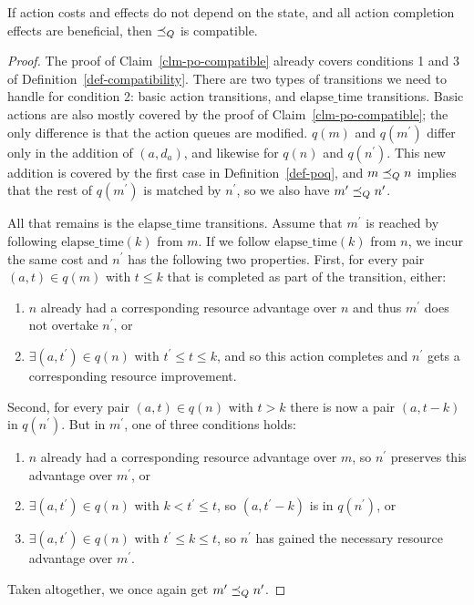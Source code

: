 \documentclass[letterpaper]{article}
\theoremstyle{plain} \newtheorem{theorem}{Theorem} \newtheorem{proposition}{Proposition} \newtheorem{lemma}{Lemma}
\theoremstyle{definition} \newtheorem{definition}{Definition} \newtheorem{conjecture}{Conjecture} \newtheorem*{example}{Example}
\theoremstyle{remark} \newtheorem*{remark}{Remark} \newtheorem*{note}{Note} \newtheorem{case}{Case}
\begin{document}
\begin{claim}{}{\label{clm-poq-compatible}}
	If action costs and effects do not depend on the state, and all action completion effects are beneficial, then $\preceq_Q$ is compatible.
\end{claim}
\begin{proof}

	The proof of Claim~\ref{clm-po-compatible} already covers conditions 1 and 3 of
Definition~\ref{def-compatibility}. There are two types of transitions we need to handle
for condition 2: basic action transitions, and $\mathrm{elapse\_time}$ transitions. Basic
actions are also mostly covered by the proof of Claim~\ref{clm-po-compatible}; the only
difference is that the action queues are modified. $q(m)$ and $q(m^\prime)$ differ only in
the addition of $(a, d_a)$, and likewise for $q(n)$ and $q(n^\prime)$. This new addition is
covered by the first case in Definition~\ref{def-poq}, and $m \preceq_Q n$ implies that the rest
of $q(m^\prime)$ is matched by $n^\prime$, so we also have $m^\prime \preceq_Q n^\prime$.

	All that remains is the $\mathrm{elapse\_time}$ transitions. Assume that $m^\prime$ is
reached by following $\mathrm{elapse\_time}(k)$ from $m$. If we follow $\mathrm{elapse\_time}(k)$ from $n$, we incur the same cost and $n^\prime$ has the following two properties. First, for every pair $(a, t) \in q(m)$ with $t \le k$ that is completed as part of the transition, either:
\begin{enumerate}
	\item $n$ already had a corresponding resource advantage over $n$ and thus $m^\prime$ does not overtake $n^\prime$, or
	\item $\exists (a, t^\prime) \in q(n)$ with $t^\prime \le t \le k$, and so this action completes and $n^\prime$ gets a corresponding resource improvement.
\end{enumerate}
Second, for every pair $(a, t) \in q(n)$ with $t > k$ there is now a pair $(a, t-k)$ in $q(n^\prime)$. But in $m^\prime$, one of three conditions holds:
\begin{enumerate}
	\item $n$ already had a corresponding resource advantage over $m$, so $n^\prime$ preserves this advantage over $m^\prime$, or
	\item $\exists (a, t^\prime) \in q(n)$ with $k < t^\prime \le t$, so $(a, t^\prime-k)$ is in $q(n^\prime)$, or
	\item $\exists (a, t^\prime) \in q(n)$ with $t^\prime \le k \le t$, so $n^\prime$ has gained the necessary resource advantage over $m^\prime$.
\end{enumerate}
Taken altogether, we once again get $m^\prime \preceq_Q n^\prime$.

\end{proof}
\end{document}
